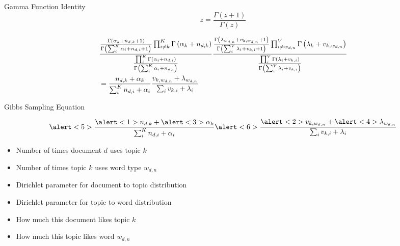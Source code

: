\documentclass[xcolor=dvipsnames]{beamer}
\newcommand{\g}[1]{\Gamma \left( #1 \right)}
\begin{document}
\begin{frame}

\begin{block}{Gamma Function Identity}
	\begin{equation}
		z = \frac{\Gamma(z + 1)}{\Gamma(z)}
	\end{equation}
\end{block}

\begin{footnotesize}
\begin{align*}
& \frac{
  \dirnum{i \not = k}{K}{\alpha_k + n_{d,k} + 1}{ \g{\sum_{i}^{K} \alpha_i +
      n_{d,i} + 1} } \g{\alpha_k + n_{d,k}}  }
{ \dirfunc{i}{K}{\alpha_i + n_{d,i}} }
\frac{
 \dirnum{i \not = w_{d,n}}{V}{\lambda_{w_{d,n}} + v_{k,w_{d,n}} + 1}{ \g{\sum_{i}^{V} \lambda_i + v_{k,i} + 1} } \g{\lambda_k + v_{k,w_{d,n}}}
}{ \dirfunc{i}{V}{\lambda_i + v_{k,i}} } \\
& = \frac{n_{d, k} + \alpha_k}{ \sum_{i}^{K} { n_{d,i} + \alpha_i}} \frac{v_{k, w_{d,n}} + \lambda_{w_{d,n}}}{ \sum_{i} { v_{k,i} + \lambda_{i} }}
\end{align*}
\end{footnotesize}

\end{frame}



\begin{frame}{Gibbs Sampling Equation}

\begin{equation}
\alert<5>{\frac{\alert<1>{n_{d, k}} +  \alert<3>{\alpha_k}}{ \sum_{i}^{K} { n_{d,i} +\alpha_i}}} \alert<6>{\frac{\alert<2>{v_{k, w_{d,n}}} + \alert<4>{\lambda_{w_{d,n}}}}{ \sum_{i} { v_{k,i} + \lambda_{i} }}}
\end{equation}

\begin{itemize}
  \item \alert<1>{Number of times document $d$ uses topic $k$}
  \item \alert<2>{Number of times topic $k$ uses word type $w_{d,n}$}
  \item \alert<3>{Dirichlet parameter for document to topic
      distribution}
  \item \alert<4>{Dirichlet parameter for topic to word distribution}
  \item \alert<5>{How much this document likes topic $k$}
  \item \alert<6>{How much this topic likes word $w_{d,n}$}
\end{itemize}

\end{frame}
\end{document}
